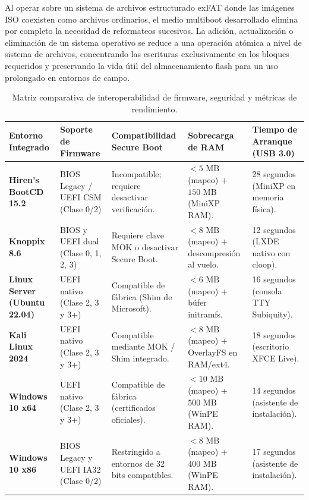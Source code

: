 \documentclass[12pt]{article}
\begin{document}
Al operar sobre un sistema de archivos estructurado exFAT donde las imágenes ISO coexisten como archivos ordinarios, el medio multiboot desarrollado elimina por completo la necesidad de reformateos sucesivos. La adición, actualización o eliminación de un sistema operativo se reduce a una operación atómica a nivel de sistema de archivos, concentrando las escrituras exclusivamente en los bloques requeridos y preservando la vida útil del almacenamiento flash para un uso prolongado en entornos de campo.

\begin{table}[htbp]
\centering
\small
\renewcommand{\arraystretch}{1.15}
\renewcommand{\tabularxcolumn}[1]{m{#1}}
\setlength{\emergencystretch}{1.5em}
\caption{Matriz comparativa de interoperabilidad de firmware, seguridad y métricas de rendimiento.}
\label{tab:matrizInteroperabilidad}
\begin{tabularx}{\textwidth}{>{\centering\arraybackslash}m{2.4cm} X X X X}
\toprule
\textbf{Entorno Integrado} & \textbf{Soporte de Firmware} & \textbf{Compatibilidad Secure Boot} & \textbf{Sobrecarga de RAM} & \textbf{Tiempo de Arranque (USB 3.0)} \\
\midrule
\textbf{Hiren's BootCD 15.2} & BIOS Legacy / UEFI CSM (Clase 0/2) & Incompatible; requiere desactivar verificación. & $< 5\text{ MB}$ (mapeo) + $150\text{ MB}$ (MiniXP RAM). & 28 segundos (MiniXP en memoria física). \\
\addlinespace
\textbf{Knoppix 8.6} & BIOS y UEFI dual (Clase 0, 1, 2, 3) & Requiere clave MOK o desactivar Secure Boot. & $< 8\text{ MB}$ (mapeo) + descompresión al vuelo. & 12 segundos (LXDE nativo con cloop). \\
\addlinespace
\textbf{Linux Server (Ubuntu 22.04)} & UEFI nativo (Clase 2, 3 y 3+) & Compatible de fábrica (Shim de Microsoft). & $< 6\text{ MB}$ (mapeo) + búfer initramfs. & 16 segundos (consola TTY Subiquity). \\
\addlinespace
\textbf{Kali Linux 2024} & UEFI nativo (Clase 2, 3 y 3+) & Compatible mediante MOK / Shim integrado. & $< 8\text{ MB}$ (mapeo) + OverlayFS en RAM/ext4. & 18 segundos (escritorio XFCE Live). \\
\addlinespace
\textbf{Windows 10 x64} & UEFI nativo (Clase 2, 3 y 3+) & Compatible de fábrica (certificados oficiales). & $< 10\text{ MB}$ (mapeo) + $500\text{ MB}$ (WinPE RAM). & 14 segundos (asistente de instalación). \\
\addlinespace
\textbf{Windows 10 x86} & BIOS Legacy y UEFI IA32 (Clase 0/2) & Restringido a entornos de 32 bits compatibles. & $< 8\text{ MB}$ (mapeo) + $400\text{ MB}$ (WinPE RAM). & 17 segundos (asistente de instalación). \\
\bottomrule
\end{tabularx}
\end{table}
\end{document}

